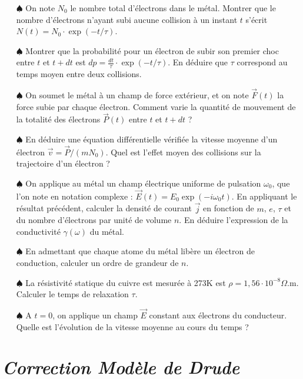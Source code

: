 \documentclass{report}
\begin{document}
\begin{itemize}
	
	\item[$\spadesuit$]	 On note $N_0$ le nombre total d'électrons dans le métal. Montrer que le nombre d'électrons n'ayant subi aucune collision à un instant $t$ s'écrit $N(t)=N_0\cdot\exp(-t/\tau)$.
	
	\item[$\spadesuit$]	 Montrer que la probabilité pour un électron de subir son premier choc entre $t$ et $t+dt$ est $dp=\frac{dt}{\tau}\cdot\exp(-t/\tau)$. En déduire que $\tau$ correspond au temps moyen entre deux collisions.
	
	\item[$\spadesuit$] On soumet le métal à un champ de force extérieur, et on note $\vec{F}(t)$ la force subie par chaque électron. Comment varie la quantité de mouvement de la totalité des électrons $\vec{P}(t)$ entre $t$ et $t+dt$ ?
	
	\item[$\spadesuit$] En déduire une équation différentielle vérifiée la vitesse moyenne d'un électron $\vec{v}=\vec{P}/(mN_0)$. Quel est l'effet moyen des collisions sur la trajectoire d'un électron ?
	
	\item[$\spadesuit$] On applique au métal un champ électrique uniforme de pulsation $\omega_0$, que l'on note en notation complexe : $\vec{E}(t)=E_0\exp(-i\omega_0t)$. En appliquant le résultat précédent, calculer la densité de courant $\vec{j}$ en fonction de $m$, $e$, $\tau$ et du nombre d'électrons par unité de volume $n$. En déduire l'expression de la conductivité $\gamma(\omega)$ du métal.
	
	\item[$\spadesuit$] En admettant que chaque atome du métal libère un électron de conduction, calculer un ordre de grandeur de $n$.
	
	\item[$\spadesuit$] La résistivité statique du cuivre est mesurée à 273K est $\rho=1,56\cdot10^{-8}\Omega$.m. Calculer le temps de relaxation $\tau$. 
	
	\item[$\spadesuit$] A $t=0$, on applique un champ $\vec{E}$ constant aux électrons du conducteur. Quelle est l'évolution de la vitesse moyenne au cours du temps ? 
\end{itemize}

\newpage

\section*{\textit{Correction Modèle de Drude}}
\end{document}
